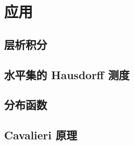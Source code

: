 \section{应用}
\label{b1:sec:1803}


\subsection{层析积分}
\label{b1:subsec:180301}

\subsection{水平集的 Hausdorff 测度}
\label{b1:subsec:180302}

\subsection{分布函数}
\label{b1:subsec:180303}

\subsection{Cavalieri 原理}
\label{b1:subsec:180304}


